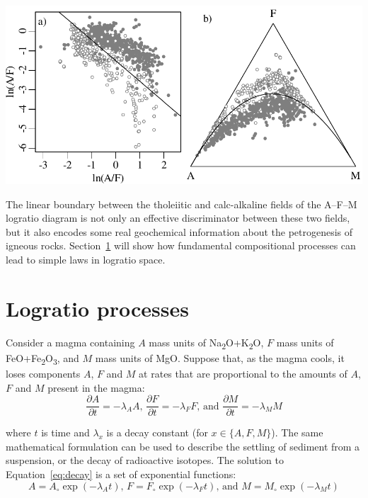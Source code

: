 \noindent\begin{minipage}[t][][b]{.7\textwidth}
\includegraphics[width=\textwidth]{../figures/LDAAFM.pdf}\medskip
\end{minipage}
\begin{minipage}[t][][t]{.3\textwidth}
  \label{fig:LDAAFM}
\end{minipage}

The linear boundary between the tholeiitic and calc-alkaline fields of
the A--F--M logratio diagram is not only an effective discriminator
between these two fields, but it also encodes some real geochemical
information about the petrogenesis of igneous
rocks. Section~\ref{sec:logratio-processes} will show how fundamental
compositional processes can lead to simple laws in logratio space.

\section{Logratio processes}
\label{sec:logratio-processes}

Consider a magma containing $A$ mass units of
Na\textsubscript{2}O+K\textsubscript{2}O, $F$ mass units of
FeO+Fe\textsubscript{2}O\textsubscript{3}, and $M$ mass units of
MgO. Suppose that, as the magma cools, it loses components $A$, $F$
and $M$ at rates that are proportional to the amounts of $A$, $F$ and
$M$ present in the magma:
\begin{equation}
  \frac{\partial A}{\partial t} = -\lambda_A A \mbox{,~}
  \frac{\partial F}{\partial t} = -\lambda_F F \mbox{,~and~}
  \frac{\partial M}{\partial t} = -\lambda_M M
  \label{eq:decay}
\end{equation}

\noindent where $t$ is time and $\lambda_x$ is a decay constant (for
$x \in \{A, F, M\}$). The same mathematical formulation can be used to
describe the settling of sediment from a suspension, or the decay of
radioactive isotopes.  The solution to Equation~\ref{eq:decay} is a
set of exponential functions:
\begin{equation}
  A = A_\circ \exp(-\lambda_A t) \mbox{,~}
  F = F_\circ \exp(-\lambda_F t) \mbox{,~and~}
  M = M_\circ \exp(-\lambda_M t)
  \label{eq:expdecay}
\end{equation}

